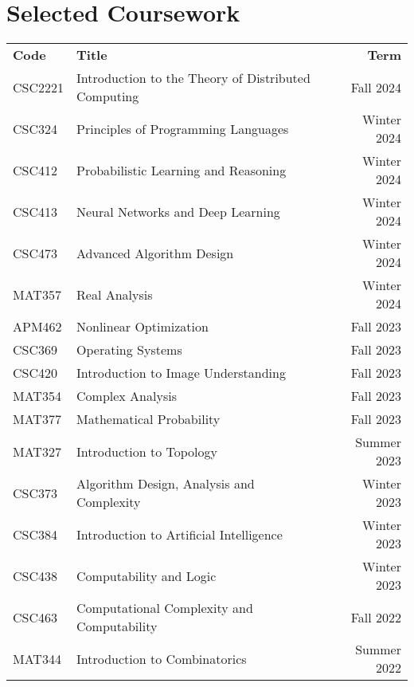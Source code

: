 \documentclass[letterpaper,11pt]{article}
\newcommand{\rom}[1]{\uppercase\expandafter{\romannumeral #1\relax}}
\begin{document}
\section{Selected Coursework}
\vspace{-0.3em}
\begin{minipage}{\textwidth}
  \centering
  \renewcommand*{\thefootnote}{\fnsymbol{footnote}}
  \renewcommand*{\thempfootnote}{\fnsymbol{mpfootnote}}
  \renewcommand{\arraystretch}{1.2}
  \begin{tabularx}{0.98\textwidth}{ p{6.0em} X r }
    \textbf{Code} & \textbf{Title} & \textbf{Term} \\
    \noalign{\vspace{0.1em}}
    \hline\hline
    \noalign{\vspace{0.2em}}
    CSC2221\footnotemark[1] & Introduction to the Theory of Distributed Computing & Fall 2024 \\

    CSC324 & Principles of Programming Languages & Winter 2024 \\
    CSC412\footnotemark[2] & Probabilistic Learning and Reasoning & Winter 2024 \\
    CSC413\footnotemark[2] & Neural Networks and Deep Learning & Winter 2024 \\
    CSC473 & Advanced Algorithm Design & Winter 2024 \\
    MAT357 & Real Analysis \rom{1} & Winter 2024 \\

    APM462 & Nonlinear Optimization & Fall 2023 \\
    CSC369 & Operating Systems & Fall 2023 \\
    CSC420 & Introduction to Image Understanding & Fall 2023 \\
    MAT354 & Complex Analysis \rom{1} & Fall 2023 \\
    MAT377 & Mathematical Probability & Fall 2023 \\

    MAT327 & Introduction to Topology & Summer 2023 \\

    CSC373 & Algorithm Design, Analysis and Complexity & Winter 2023 \\
    CSC384 & Introduction to Artificial Intelligence & Winter 2023 \\
    CSC438 & Computability and Logic & Winter 2023 \\

    CSC463 & Computational Complexity and Computability & Fall 2022 \\

    MAT344 & Introduction to Combinatorics & Summer 2022
  \end{tabularx}
\end{minipage}

\end{document}
